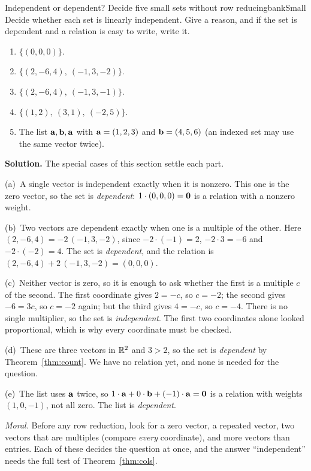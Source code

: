 \documentclass[11pt]{article}
\begin{document}
\begin{exmp}{Independent or dependent? Decide five small sets without row reducing}{bankSmall}
Decide whether each set is linearly independent. Give a reason, and if the set is dependent and a relation is easy to write, write it.
\begin{enumerate}[label=(\alph*),itemsep=2pt]
  \item $\{(0,0,0)\}$.
  \item $\{(2,-6,4),\ (-1,3,-2)\}$.
  \item $\{(2,-6,4),\ (-1,3,-1)\}$.
  \item $\{(1,2),\ (3,1),\ (-2,5)\}$.
  \item The list $\mathbf{a},\mathbf{b},\mathbf{a}$ with $\mathbf{a}=(1,2,3)$ and $\mathbf{b}=(4,5,6)$ (an indexed set may use the same vector twice).
\end{enumerate}

\textbf{Solution.} The special cases of this section settle each part.

(a)~A single vector is independent exactly when it is nonzero. This one is the zero vector, so the set is \emph{dependent}: $1\cdot(0,0,0)=\mathbf{0}$ is a relation with a nonzero weight.

(b)~Two vectors are dependent exactly when one is a multiple of the other. Here $(2,-6,4)=-2\,(-1,3,-2)$, since $-2\cdot(-1)=2$, $-2\cdot3=-6$ and $-2\cdot(-2)=4$. The set is \emph{dependent}, and the relation is $(2,-6,4)+2\,(-1,3,-2)=(0,0,0)$.

(c)~Neither vector is zero, so it is enough to ask whether the first is a multiple $c$ of the second. The first coordinate gives $2=-c$, so $c=-2$; the second gives $-6=3c$, so $c=-2$ again; but the third gives $4=-c$, so $c=-4$. There is no single multiplier, so the set is \emph{independent}. The first two coordinates alone looked proportional, which is why every coordinate must be checked.

(d)~These are three vectors in $\mathbb{R}^2$ and $3>2$, so the set is \emph{dependent} by Theorem~\ref{thm:count}. We have no relation yet, and none is needed for the question.

(e)~The list uses $\mathbf{a}$ twice, so $1\cdot\mathbf{a}+0\cdot\mathbf{b}+(-1)\cdot\mathbf{a}=\mathbf{0}$ is a relation with weights $(1,0,-1)$, not all zero. The list is \emph{dependent}.

\emph{Moral.} Before any row reduction, look for a zero vector, a repeated vector, two vectors that are multiples (compare \emph{every} coordinate), and more vectors than entries. Each of these decides the question at once, and the answer ``independent'' needs the full test of Theorem~\ref{thm:cols}.
\end{exmp}
\end{document}
